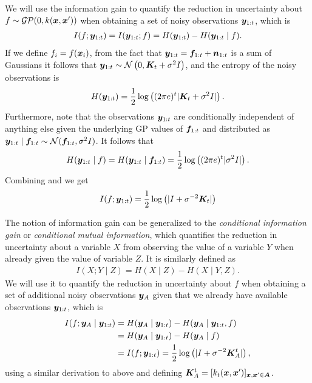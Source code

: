 We will use the information gain to quantify the reduction in uncertainty
about $f \sim \mathcal{GP}(0, k(\bm{x}, \bm{x}'))$ when obtaining a set of
noisy observations $\bm{y}_{1:t}$, which is
\begin{align*}
I(f; \bm{y}_{1:t}) = I(\bm{y}_{1:t}; f) = H(\bm{y}_{1:t}) - H(\bm{y}_{1:t}\mid f).
\end{align*}
If we define $f_i = f(\bm{x}_i)$, from the fact that
$\bm{y}_{1:t} = \bm{f}_{1:t} + \bm{n}_{1:t}$ is a sum of Gaussians it follows that
$\bm{y}_{1:t} \sim \mathcal{N}\left(0, \bm{K}_t + \sigma^2 I\right)$, and the
entropy of the noisy observations is
\begin{align}\label{eq:hy}
H(\bm{y}_{1:t}) = \frac{1}{2}\log\left((2\pi e)^t |\bm{K}_t + \sigma^2 I|\right).
\end{align}
Furthermore, note that the observations $\bm{y}_{1:t}$ are conditionally
independent of anything else given the underlying GP values
of $\bm{f}_{1:t}$ and distributed as
$\bm{y}_{1:t}\mid \bm{f}_{1:t} \sim \mathcal{N}(\bm{f}_{1:t}, \sigma^2 I)$.
It follows that
\begin{align}\label{eq:hyf}
H(\bm{y}_{1:t}\mid f) = H(\bm{y}_{1:t}\mid \bm{f}_{1:t}) = \frac{1}{2}\log\left((2\pi e)^t |\sigma^2 I|\right).
\end{align}
Combining  and  we get
\begin{align*}
I(f; \bm{y}_{1:t}) = \frac{1}{2}\log\left(|I + \sigma^{-2} \bm{K}_t|\right)
\end{align*} 

The notion of information gain can be generalized to the \emph{conditional
information gain} or \emph{conditional mutual information}, which quantifies
the reduction in uncertainty about a variable $X$ from observing the value
of a variable $Y$ when already given the value of variable $Z$. It is
similarly defined as
\begin{align*}
I(X; Y\mid Z) = H(X\mid Z) - H(X\mid Y, Z).
\end{align*} We will use it to quantify the reduction in uncertainty about $f$ when
obtaining a set of additional noisy observations $\bm{y}_A$ given that
we already have available observations $\bm{y}_{1:t}$, which is
\begin{align*}
I(f; \bm{y}_A\mid \bm{y}_{1:t}) &= H(\bm{y}_A\mid \bm{y}_{1:t}) - H(\bm{y}_A\mid \bm{y}_{1:t}, f)\\
                          &= H(\bm{y}_A\mid \bm{y}_{1:t}) - H(\bm{y}_A\mid f)\\
                          &= I(f; \bm{y}_{1:t}) = \frac{1}{2}\log\left(|I + \sigma^{-2} \bm{K}^t_A|\right),
\end{align*}
using a similar derivation to above and defining
${\bm{K}^t_A = [k_t(\bm{x}, \bm{x}')]_{\bm{x}, \bm{x}'\in\bm{A}}}$.